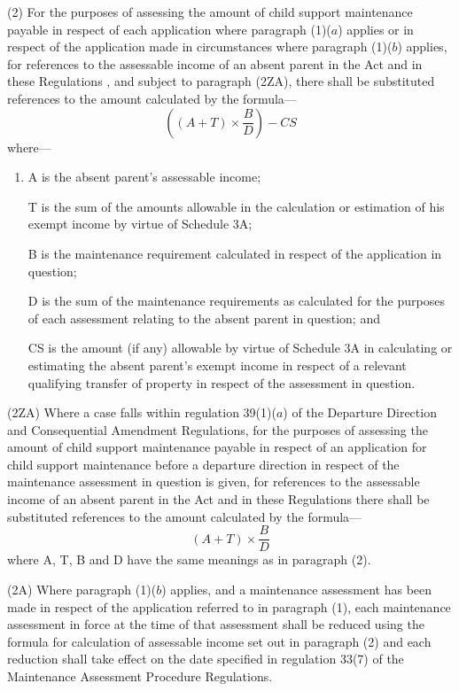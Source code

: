 \documentclass[12pt,a4paper]{article}
\begin{document}
(2) For the purposes of assessing the amount of child support maintenance payable in respect of each application where 
paragraph (1)($a$)  %
applies
or in respect of the application made in circumstances where paragraph (1)($b$) applies, %
for references to the assessable income of an absent parent in the Act and in these Regulations%
, and subject to paragraph (2ZA),  %
there shall be substituted references to the amount calculated by the formula—
\[ \left( (A + T) \times \frac{B}{D}\right) - CS\]
where—
\begin{enumerate}\item[]
A is the absent parent’s assessable income;

T is the sum of the amounts allowable in the calculation or estimation of his exempt income by virtue of Schedule 3A;

B is the maintenance requirement calculated in respect of the application in question;

D is the sum of the maintenance requirements as calculated for the purposes of each assessment relating to the absent parent in question; and

CS is the amount (if any) allowable by virtue of Schedule 3A in calculating or estimating the absent parent’s exempt income in respect of a relevant qualifying transfer of property in respect of the assessment in question.
\end{enumerate}

(2ZA) Where a case falls within regulation 39(1)($a$) of the Departure Direction
and Consequential Amendment Regulations, for the purposes of assessing the
amount of child support maintenance payable in respect of an application for
child support maintenance before a departure direction in respect of the
maintenance assessment in question is given, for references to the assessable
income of an absent parent in the Act and in these Regulations there shall be
substituted references to the amount calculated by the formula—
\[(A + T) \times \frac{B}{D}\]
where A, T, B and D have the same meanings as in paragraph (2).

(2A) Where paragraph (1)($b$) applies, and a maintenance assessment has been made in respect of the application referred to in paragraph (1), each maintenance assessment in force at the time of that assessment shall be reduced using the formula for calculation of assessable income set out in paragraph (2) and each reduction shall take effect on the date specified in regulation 33(7) of the Maintenance Assessment Procedure Regulations.
\end{document}
